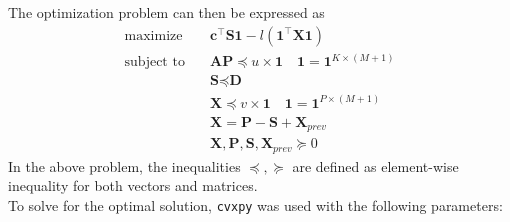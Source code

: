 \documentclass[11pt]{article}
\begin{document}
The optimization problem can then be expressed as
\begin{align*}
  \text{maximize} & \quad \textbf{c}^\top \textbf{S} \textbf{1} - l(\textbf{1}^\top \textbf{X} \textbf{1}) \\
  \text{subject to} & \quad \textbf{A} \textbf{P} \preceq u \times \textbf{1} \quad \textbf{1} = \textbf{1}^{K \times (M+1)}\\
  & \quad \textbf{S} \preceq \textbf{D} \\
  & \quad \textbf{X} \preceq v \times \textbf{1} \quad \textbf{1} = \textbf{1}^{P \times (M+1)}\\
  & \quad \textbf{X} = \textbf{P} - \textbf{S} + \textbf{X}_{prev} \\
  & \quad \textbf{X}, \textbf{P}, \textbf{S}, \textbf{X}_{prev} \succeq 0
\end{align*}
In the above problem, the inequalities $\preceq, \succeq$ are defined as element-wise inequality for both vectors and matrices.
\\ 
To solve for the optimal solution, \texttt{cvxpy} was used with the following parameters:
\end{document}

